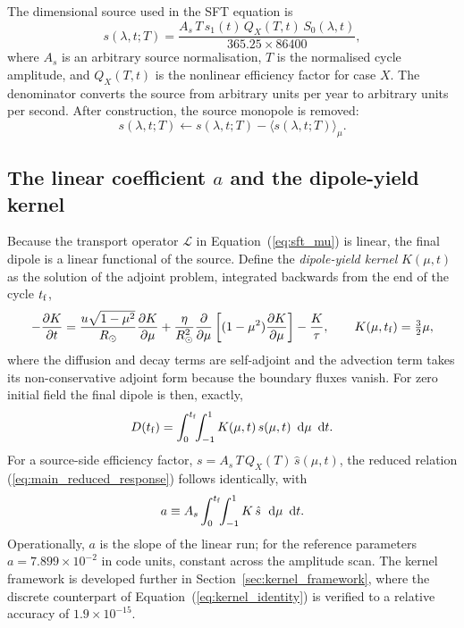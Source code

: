 \documentclass[namedreferences,hyperref,optionalrh,solaromanenum]{spr-sola}
\newcommand{\rmd}{{\ \mathrm d}}
\begin{document}
The dimensional source used in the SFT equation is
%
\begin{equation}
s(\lambda,t;T)
=
\frac{
A_s\,T\,s_1(t)\,Q_X(T,t)\,S_0(\lambda,t)
}
{365.25\times86400},
\label{eq:source_full}
\end{equation}
%
where $A_s$ is an arbitrary source normalisation, $T$ is the normalised
cycle amplitude, and $Q_X(T,t)$ is the nonlinear efficiency factor for
case $X$. The denominator converts the source from arbitrary units per
year to arbitrary units per second. After construction, the source
monopole is removed:
%
\begin{equation}
s(\lambda,t;T)
\leftarrow
s(\lambda,t;T)
-
\langle s(\lambda,t;T)\rangle_\mu .
\label{eq:source_monopole}
\end{equation}

\subsection{The linear coefficient \texorpdfstring{$a$}{a} and the
dipole-yield kernel}
\label{subsec:linear_coefficient}

Because the transport operator $\mathcal{L}$ in
Equation~(\ref{eq:sft_mu}) is linear, the final dipole is a linear
functional of the source. Define the \emph{dipole-yield kernel}
$K(\mu,t)$ as the solution of the adjoint problem, integrated backwards
from the end of the cycle $t_{\rm f}$,
%
\begin{equation}
-\frac{\partial K}{\partial t}
=
\frac{u\sqrt{1-\mu^2}}{R_\odot}\frac{\partial K}{\partial\mu}
+
\frac{\eta}{R_\odot^2}\frac{\partial}{\partial\mu}
\left[(1-\mu^2)\frac{\partial K}{\partial\mu}\right]
-\frac{K}{\tau},
\qquad
K(\mu,t_{\rm f})=\tfrac{3}{2}\mu ,
\label{eq:adjoint}
\end{equation}
%
where the diffusion and decay terms are self-adjoint and the advection
term takes its non-conservative adjoint form because the boundary fluxes
vanish. For zero initial field the final dipole is then, exactly,
%
\begin{equation}
D(t_{\rm f})
=
\int_0^{t_{\rm f}}\!\!\int_{-1}^{1}
K(\mu,t)\,s(\mu,t)\,\rmd\mu\,\rmd t .
\label{eq:kernel_identity}
\end{equation}
%
For a source-side efficiency factor,
$s=A_s\,T\,Q_X(T)\,\hat{s}(\mu,t)$, the reduced relation
(\ref{eq:main_reduced_response}) follows identically, with
%
\begin{equation}
a
\equiv
A_s
\int_0^{t_{\rm f}}\!\!\int_{-1}^{1}
K\,\hat{s}\;\rmd\mu\,\rmd t .
\label{eq:a_definition}
\end{equation}
%
Operationally, $a$ is the slope of the linear run; for the reference
parameters $a=7.899\times10^{-2}$ in code units, constant across the
amplitude scan. The kernel framework is developed further in
Section~\ref{sec:kernel_framework}, where the discrete counterpart of
Equation~(\ref{eq:kernel_identity}) is verified to a relative accuracy of
$1.9\times10^{-15}$.
\end{document}
